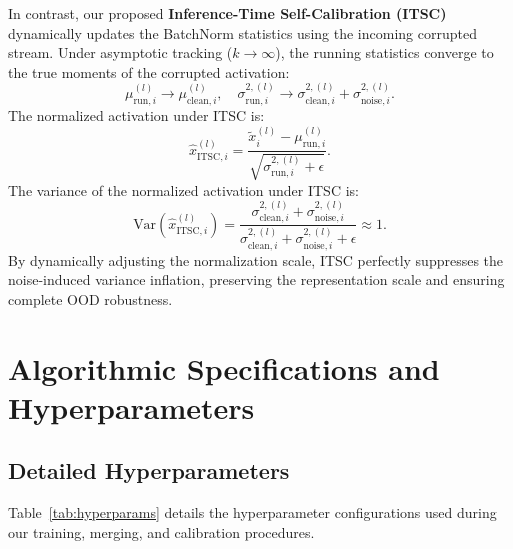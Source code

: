 \documentclass{article}
\theoremstyle{plain}
\theoremstyle{definition}
\theoremstyle{remark}
\begin{document}
In contrast, our proposed \textbf{Inference-Time Self-Calibration (ITSC)} dynamically updates the BatchNorm statistics using the incoming corrupted stream. Under asymptotic tracking ($k \to \infty$), the running statistics converge to the true moments of the corrupted activation:
\begin{equation}
    \mu_{\text{run}, i}^{(l)} \to \mu_{\text{clean}, i}^{(l)}, \quad \sigma_{\text{run}, i}^{2,(l)} \to \sigma_{\text{clean}, i}^{2,(l)} + \sigma_{\text{noise}, i}^{2,(l)}.
\end{equation}
The normalized activation under ITSC is:
\begin{equation}
    \hat{x}_{\text{ITSC}, i}^{(l)} = \frac{\tilde{x}_i^{(l)} - \mu_{\text{run}, i}^{(l)}}{\sqrt{\sigma_{\text{run}, i}^{2,(l)} + \epsilon}}.
\end{equation}
The variance of the normalized activation under ITSC is:
\begin{equation}
    \text{Var}\left(\hat{x}_{\text{ITSC}, i}^{(l)}\right) = \frac{\sigma_{\text{clean}, i}^{2,(l)} + \sigma_{\text{noise}, i}^{2,(l)}}{\sigma_{\text{clean}, i}^{2,(l)} + \sigma_{\text{noise}, i}^{2,(l)} + \epsilon} \approx 1.
\end{equation}
By dynamically adjusting the normalization scale, ITSC perfectly suppresses the noise-induced variance inflation, preserving the representation scale and ensuring complete OOD robustness.

\section{Algorithmic Specifications and Hyperparameters}
\label{app:hyperparams}

\subsection{Detailed Hyperparameters}
Table~\ref{tab:hyperparams} details the hyperparameter configurations used during our training, merging, and calibration procedures.
\end{document}
